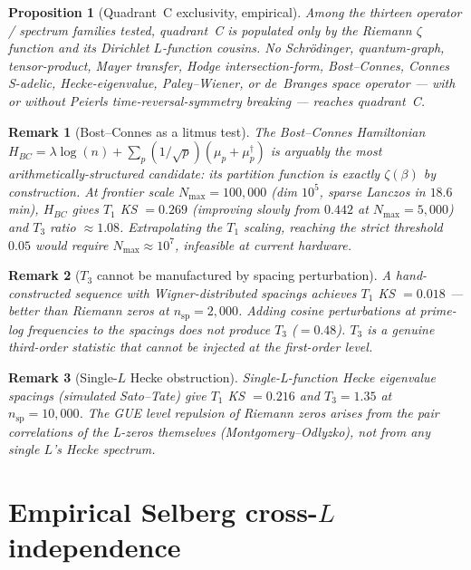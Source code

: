 \documentclass[11pt,a4paper]{article}
\newtheorem{proposition}{Proposition}
\newtheorem{remark}{Remark}
\begin{document}
\begin{proposition}[Quadrant~C exclusivity, empirical]\label{prop:exclusivity}
Among the thirteen operator / spectrum families tested, quadrant~C is
populated only by the Riemann $\zeta$ function and its Dirichlet
$L$-function cousins. No Schr\"odinger, quantum-graph, tensor-product,
Mayer transfer, Hodge intersection-form, Bost--Connes, Connes S-adelic,
Hecke-eigenvalue, Paley--Wiener, or de~Branges space operator —
with or without Peierls time-reversal-symmetry breaking — reaches
quadrant~C.
\end{proposition}

\begin{remark}[Bost--Connes as a litmus test]
The Bost--Connes Hamiltonian
$H_{BC} = \lambda \log(n) + \sum_p (1/\sqrt p)(\mu_p + \mu_p^\dagger)$
is arguably the most arithmetically-structured candidate: its
partition function is exactly $\zeta(\beta)$ by construction. At
frontier scale $N_{\max} = 100{,}000$ (dim $10^5$, sparse Lanczos in
$18.6$\,min), $H_{BC}$ gives $T_1$ KS $= 0.269$ (improving slowly
from $0.442$ at $N_{\max}=5{,}000$) and $T_3$ ratio $\approx 1.08$.
Extrapolating the $T_1$ scaling, reaching the strict threshold
$0.05$ would require $N_{\max} \approx 10^7$, infeasible at current
hardware.
\end{remark}

\begin{remark}[$T_3$ cannot be manufactured by spacing perturbation]
A hand-constructed sequence with Wigner-distributed spacings achieves
$T_1$ KS $= 0.018$ --- better than Riemann zeros at $n_\text{sp}=2{,}000$.
Adding cosine perturbations at prime-log frequencies to the spacings
does not produce $T_3$ ($ = 0.48$). $T_3$ is a genuine third-order
statistic that cannot be injected at the first-order level.
\end{remark}

\begin{remark}[Single-$L$ Hecke obstruction]
Single-L-function Hecke eigenvalue spacings (simulated Sato--Tate)
give $T_1$ KS $= 0.216$ and $T_3 = 1.35$ at $n_\text{sp}=10{,}000$.
The GUE level repulsion of Riemann zeros arises from the \emph{pair
correlations of the L-zeros themselves} (Montgomery--Odlyzko), not
from any single $L$'s Hecke spectrum.
\end{remark}

\section{Empirical Selberg cross-$L$ independence}\label{sec:selberg}
\end{document}
